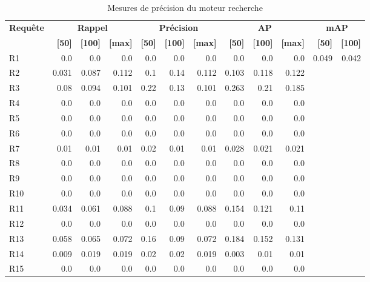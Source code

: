 \begin{table}[H]
\centering
\begin{tabular}{l|rrr|rrr|rrr|rr}
\toprule
\textbf{Requête} & \multicolumn{3}{c}{\textbf{Rappel}} & \multicolumn{3}{c}{\textbf{Précision}} & \multicolumn{3}{c}{\textbf{AP}} & \multicolumn{2}{c}{\textbf{mAP}} \\
 & \textbf{[50]} & \textbf{[100]} & \textbf{[max]} & \textbf{[50]} & \textbf{[100]} & \textbf{[max]} & \textbf{[50]} & \textbf{[100]} & \textbf{[max]} & \textbf{[50]} & \textbf{[100]} \\
\midrule
R1 & 0.0 & 0.0 & 0.0 & 0.0 & 0.0 & 0.0 & 0.0 & 0.0 & 0.0 & \multirow{15}{*}{0.049} & \multirow{15}{*}{0.042} \\
R2 & 0.031 & 0.087 & 0.112 & 0.1 & 0.14 & 0.112 & 0.103 & 0.118 & 0.122 \\
R3 & 0.08 & 0.094 & 0.101 & 0.22 & 0.13 & 0.101 & 0.263 & 0.21 & 0.185 \\
R4 & 0.0 & 0.0 & 0.0 & 0.0 & 0.0 & 0.0 & 0.0 & 0.0 & 0.0 \\
R5 & 0.0 & 0.0 & 0.0 & 0.0 & 0.0 & 0.0 & 0.0 & 0.0 & 0.0 \\
R6 & 0.0 & 0.0 & 0.0 & 0.0 & 0.0 & 0.0 & 0.0 & 0.0 & 0.0 \\
R7 & 0.01 & 0.01 & 0.01 & 0.02 & 0.01 & 0.01 & 0.028 & 0.021 & 0.021 \\
R8 & 0.0 & 0.0 & 0.0 & 0.0 & 0.0 & 0.0 & 0.0 & 0.0 & 0.0 \\
R9 & 0.0 & 0.0 & 0.0 & 0.0 & 0.0 & 0.0 & 0.0 & 0.0 & 0.0 \\
R10 & 0.0 & 0.0 & 0.0 & 0.0 & 0.0 & 0.0 & 0.0 & 0.0 & 0.0 \\
R11 & 0.034 & 0.061 & 0.088 & 0.1 & 0.09 & 0.088 & 0.154 & 0.121 & 0.11 \\
R12 & 0.0 & 0.0 & 0.0 & 0.0 & 0.0 & 0.0 & 0.0 & 0.0 & 0.0 \\
R13 & 0.058 & 0.065 & 0.072 & 0.16 & 0.09 & 0.072 & 0.184 & 0.152 & 0.131 \\
R14 & 0.009 & 0.019 & 0.019 & 0.02 & 0.02 & 0.019 & 0.003 & 0.01 & 0.01 \\
R15 & 0.0 & 0.0 & 0.0 & 0.0 & 0.0 & 0.0 & 0.0 & 0.0 & 0.0 \\
\bottomrule
\end{tabular}
\caption{Mesures de précision du moteur recherche}
\label{tab:results}
\end{table}
